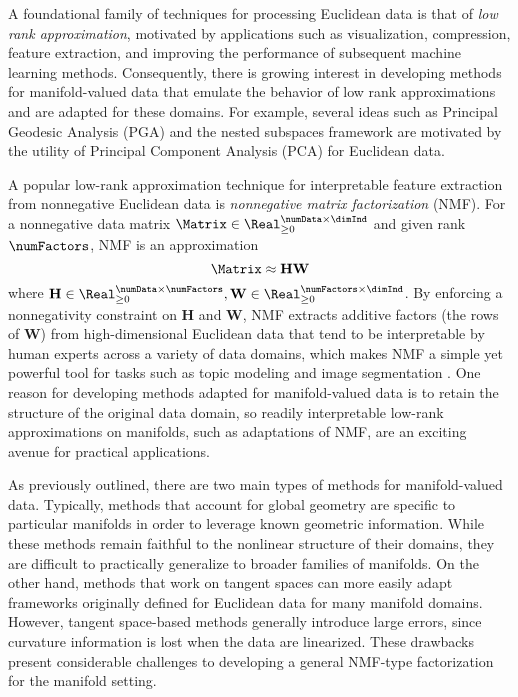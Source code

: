A foundational family of  techniques for processing Euclidean data is that of \emph{low rank approximation}, motivated by applications such as visualization, compression, feature extraction, and improving the performance of subsequent machine learning methods. Consequently, there is growing interest in developing methods for manifold-valued data that emulate the behavior of low rank approximations and are adapted for these domains. For example, several ideas such as Principal Geodesic Analysis (PGA) \citep{fletcher2004principal,fletcher2004principal2} and the nested subspaces framework \citep{jung2012analysis,yang2021nested} are motivated by the utility of Principal Component Analysis (PCA) for Euclidean data. 

A popular low-rank approximation technique for interpretable feature extraction from nonnegative Euclidean data is \emph{nonnegative matrix factorization} (NMF). For a nonnegative data matrix $\Matrix \in \Real_{\geq 0}^{\numData \times \dimInd}$ and given rank $\numFactors$, NMF is an approximation
\begin{equation}
    \Matrix \approx \mathbf{H} \mathbf{W} 
\end{equation}
where $\mathbf{H} \in \Real_{\geq 0}^{\numData \times \numFactors}, \mathbf{W} \in \Real_{\geq 0}^{\numFactors \times \dimInd}$. By enforcing a nonnegativity constraint on $\mathbf{H}$ and $\mathbf{W}$, NMF extracts additive factors (the rows of $\mathbf{W}$) from high-dimensional Euclidean data that tend to be interpretable by human experts across a variety of data domains, which makes NMF a simple yet powerful tool for tasks such as topic modeling and image segmentation \citep{Lee1999}. One reason for developing methods adapted for manifold-valued data is to retain the structure of the original data domain, so readily interpretable low-rank approximations on manifolds, such as adaptations of NMF, are an exciting avenue for practical applications.

As previously outlined, there are two main types of methods for manifold-valued data. Typically, methods that account for global geometry are specific to particular manifolds in order to leverage known geometric information. While these methods remain faithful to the nonlinear structure of their domains, they are difficult to practically generalize to broader families of manifolds. On the other hand, methods that work on tangent spaces can more easily adapt frameworks originally defined for Euclidean data for many manifold domains. However, tangent space-based methods generally introduce large errors, since curvature information is lost when the data are linearized. These drawbacks present considerable challenges to developing a general NMF-type factorization for the manifold setting. 


